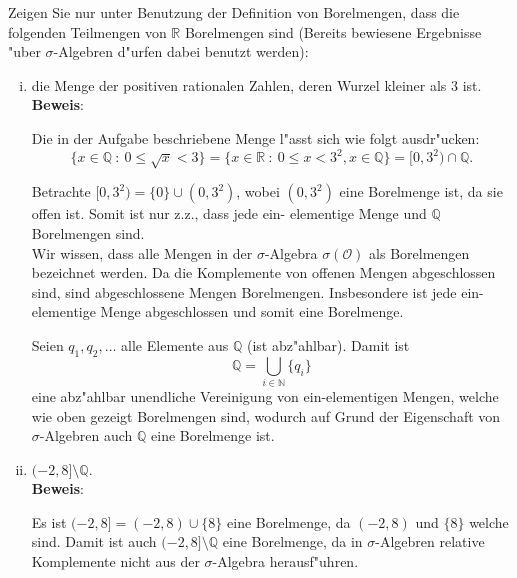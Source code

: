 \documentclass[11pt,a4paper,ngerman]{article}
\newcommand{\set}[1]{ \{ #1 \}}
\newcommand{\N}{\mathbb{N}}
\newcommand{\Q}{\mathbb{Q}}
\newcommand{\R}{\mathbb{R}}
\newcommand{\bigO}{\mathcal{O}}
\begin{document}
Zeigen Sie nur unter Benutzung der Definition von Borelmengen, dass die folgenden
Teilmengen von $\R$ Borelmengen sind (Bereits bewiesene Ergebnisse "uber
$\sigma$-Algebren d"urfen dabei benutzt werden):

\begin{enumerate}[(i)]
  \item die Menge der positiven rationalen Zahlen, deren Wurzel kleiner als $3$
    ist.\\

    \textbf{Beweis}:

    Die in der Aufgabe beschriebene Menge l"asst sich wie folgt ausdr"ucken: \[
      \set{x \in \Q\ :\ 0 \le \sqrt x < 3} =
      \set{x \in \R\ :\ 0 \le x < 3 ^ 2, x \in \Q} = [0, 3^2) \cap \Q.
    \]

    Betrachte $[0, 3^2) = \set{0} \cup (0, 3^2)$, wobei $(0, 3^2)$ eine
    Borelmenge ist, da sie offen ist. Somit ist nur z.z., dass jede ein-
    elementige Menge und $\Q$ Borelmengen sind. \\

    Wir wissen, dass alle Mengen in der $\sigma$-Algebra $\sigma(\bigO)$ als
    Borelmengen bezeichnet werden. Da die Komplemente von offenen Mengen
    abgeschlossen sind, sind abgeschlossene Mengen Borelmengen. Insbesondere ist
    jede ein-elementige Menge abgeschlossen und somit eine Borelmenge.

    Seien $q_1, q_2, \ldots$ alle Elemente aus $\Q$ (ist abz"ahlbar).
    Damit ist \[
      \Q = \bigcup_{i\in\N} \set{q_i}
    \]
    eine abz"ahlbar unendliche Vereinigung von ein-elementigen Mengen, welche
    wie oben gezeigt Borelmengen sind, wodurch auf Grund der Eigenschaft von
    $\sigma$-Algebren auch $\Q$ eine Borelmenge ist.

  \item $(-2, 8] \setminus \Q.$\\

    \textbf{Beweis}:

    Es ist $(-2, 8] = (-2, 8) \cup \set 8$ eine Borelmenge, da $(-2, 8)$ und
    $\set 8$ welche sind. Damit ist auch $(-2, 8] \setminus \Q$ eine Borelmenge,
    da in $\sigma$-Algebren relative Komplemente nicht aus der $\sigma$-Algebra
    herausf"uhren.

\end{enumerate}

\label{LastPage}
\end{document}
